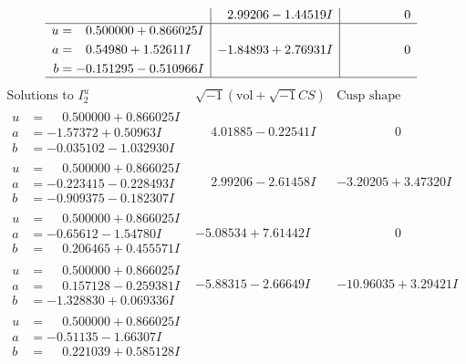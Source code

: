 \documentclass[1p]{elsarticle_modified}
\theoremstyle{definition}
\newcommand{\I}{\sqrt{-1}}
\begin{document}
$$\begin{array}{c|c|c}
 & \phantom{-}2.99206 - 1.44519 I & \phantom{-0.000000 } 0 \\ \hline\begin{aligned}
u &= \phantom{-}0.500000 + 0.866025 I \\
a &= \phantom{-}0.54980 + 1.52611 I \\
b &= -0.151295 - 0.510966 I\end{aligned}
 & -1.84893 + 2.76931 I & \phantom{-0.000000 } 0\\
 \hline 
 \end{array}$$\newpage$$\begin{array}{c|c|c}  
\text{Solutions to }I^u_{2}& \I (\text{vol} + \sqrt{-1}CS) & \text{Cusp shape}\\
 \hline 
\begin{aligned}
u &= \phantom{-}0.500000 + 0.866025 I \\
a &= -1.57372 + 0.50963 I \\
b &= -0.035102 - 1.032930 I\end{aligned}
 & \phantom{-}4.01885 - 0.22541 I & \phantom{-0.000000 } 0 \\ \hline\begin{aligned}
u &= \phantom{-}0.500000 + 0.866025 I \\
a &= -0.223415 - 0.228493 I \\
b &= -0.909375 - 0.182307 I\end{aligned}
 & \phantom{-}2.99206 - 2.61458 I & -3.20205 + 3.47320 I \\ \hline\begin{aligned}
u &= \phantom{-}0.500000 + 0.866025 I \\
a &= -0.65612 - 1.54780 I \\
b &= \phantom{-}0.206465 + 0.455571 I\end{aligned}
 & -5.08534 + 7.61442 I & \phantom{-0.000000 } 0 \\ \hline\begin{aligned}
u &= \phantom{-}0.500000 + 0.866025 I \\
a &= \phantom{-}0.157128 - 0.259381 I \\
b &= -1.328830 + 0.069336 I\end{aligned}
 & -5.88315 - 2.66649 I & -10.96035 + 3.29421 I \\ \hline\begin{aligned}
u &= \phantom{-}0.500000 + 0.866025 I \\
a &= -0.51135 - 1.66307 I \\
b &= \phantom{-}0.221039 + 0.585128 I\end{aligned}

\end{array}$$
\end{document}
